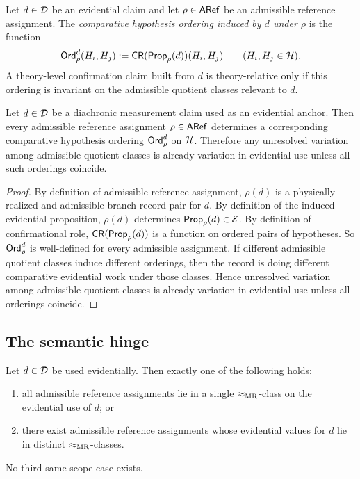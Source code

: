 \begin{definition}
Let $d\in\mathcal{D}$ be an evidential claim and let $\rho\in\mathsf{ARef}$ be an admissible reference assignment.
The \emph{comparative hypothesis ordering induced by $d$ under $\rho$} is the function
\[
\mathsf{Ord}_\rho^d(H_i,H_j):=\mathsf{CR}(\mathsf{Prop}_\rho(d))(H_i,H_j)
\qquad (H_i,H_j\in\mathcal{H}).
\]
A theory-level confirmation claim built from $d$ is theory-relative only if this ordering is invariant
on the admissible quotient classes relevant to $d$.
\end{definition}

\begin{proposition}
\label{prop:assignment-sensitive}
Let $d\in\mathcal{D}$ be a diachronic measurement claim used as an evidential anchor. Then every
admissible reference assignment $\rho\in\mathsf{ARef}$ determines a corresponding comparative hypothesis
ordering $\mathsf{Ord}_\rho^d$ on $\mathcal{H}$. Therefore any unresolved variation among admissible quotient
classes is already variation in evidential use unless all such orderings coincide.
\end{proposition}

\begin{proof}
By definition of admissible reference assignment, $\rho(d)$ is a physically realized and admissible
branch-record pair for $d$. By definition of the induced evidential proposition, $\rho(d)$ determines
$\mathsf{Prop}_\rho(d)\in\mathcal{E}$. By definition of confirmational role, $\mathsf{CR}(\mathsf{Prop}_\rho(d))$ is a function on
ordered pairs of hypotheses. So $\mathsf{Ord}_\rho^d$ is well-defined for every admissible assignment. If
different admissible quotient classes induce different orderings, then the record is doing different
comparative evidential work under those classes. Hence unresolved variation among admissible
quotient classes is already variation in evidential use unless all orderings coincide.
\end{proof}

\subsection{The semantic hinge}

\begin{lemma}
\label{thm:two-case-exhaustion}
\label{lem:dichotomy-admissible-assignments}
Let $d\in\mathcal{D}$ be used evidentially. Then exactly one of the following holds:
\begin{enumerate}
    \item all admissible reference assignments lie in a single $\mathrel{\approx_{\mathrm{MR}}}$-class on the evidential use of
    $d$; or
    \item there exist admissible reference assignments whose evidential values for $d$ lie in distinct
    $\mathrel{\approx_{\mathrm{MR}}}$-classes.
\end{enumerate}
No third same-scope case exists.
\end{lemma}

